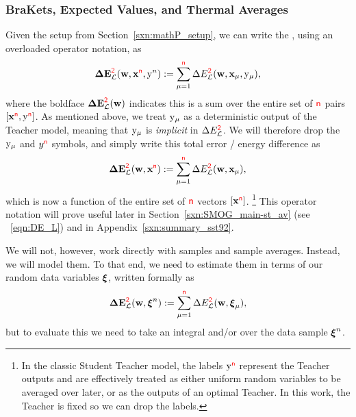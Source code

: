 \subsubsection{BraKets, Expected Values, and Thermal Averages}
\label{sxn:mathP_averages}
Given the setup from Section~\ref{sxn:mathP_setup},
we can write the \TotalDataSampleError,
using an overloaded operator notation, as
\begin{align}
  \label{eqn:detopxy}
  \mathbf{\Delta {E}}^{{\color{red}\sf{2}}}_{\mathcal{L}}(\mathbf{w}, \mathbf{x}^{{\color{red}\sf{n}}}, \mathrm{y}^{n}) :=\sum_{\mu=1}^{{\color{red}\sf{n}}}\Delta E^{{\color{red}\sf{2}}}_{\mathcal{L}}({\mathbf{w}},{\mathbf{x}}_{\mu}, \mathrm{y}_{\mu})  ,
\end{align}
where the boldface $\mathbf{\Delta {E}}^{{\color{red}\sf{2}}}_{\mathcal{L}}(\mathbf{w})$ indicates this is a sum over the entire set of ${\color{red}\sf{n}}$ pairs $[\mathbf{x}^{{\color{red}\sf{n}}}, \mathrm{y}^{{\color{red}\sf{n}}}]$.
As mentioned above, we treat $\mathrm{y}_{\mu}$ as a deterministic output of the Teacher model, meaning that
$\mathrm{y}_{\mu}$ is \emph{implicit} in $\Delta E^{{\color{red}\sf{2}}}_{\mathcal{L}}$.
We will therefore drop the $\mathrm{y}_{\mu}$ and $y^{{\color{red}\sf{n}}}$ symbols, 
and simply write this total error / energy difference as
\begin{align}
  \label{eqn:detox_FIXLATER}
  \mathbf{\Delta {E}}^{{\color{red}\sf{2}}}_{\mathcal{L}}(\mathbf{w}, \mathbf{x}^{{\color{red}\sf{n}}}) :=\sum_{\mu=1}^{{\color{red}\sf{n}}}\Delta E^{{\color{red}\sf{2}}}_{\mathcal{L}}({\mathbf{w}},{\mathbf{x}}_{\mu})  ,
\end{align}
which is now a function of the entire set of ${\color{red}\sf{n}}$ vectors $[\mathbf{x}^{{\color{red}\sf{n}}}]$.%
\footnote{In the classic Student Teacher model, the labels  $\mathrm{y}^{{\color{red}\sf{n}}}$ represent the Teacher outputs and are effectively treated as either uniform random variables to be averaged over later, or as the outputs of an optimal Teacher. In this work, the Teacher is fixed so we can drop the labels.}
This operator notation will prove useful later in Section~\ref{sxn:SMOG_main-st_av}
(see \EQN~\ref{eqn:DE_L}) and in Appendix~\ref{sxn:summary_sst92}.

We will not, however, work directly with samples and sample averages.
Instead, we will model them.
To that end, we need to estimate them 
in terms of our random data variables $\boldsymbol{\xi}$, written formally as
\begin{align}
\label{eqn:tdse}
\mathbf{\Delta {E}}^{{\color{red}\sf{2}}}_{\mathcal{L}}(\mathbf{w}, \boldsymbol{\xi}^{n}) := \sum_{\mu=1}^{{\color{red}\sf{n}}}\Delta E^{{\color{red}\sf{2}}}_{\mathcal{L}}(\mathbf{w},\boldsymbol{\xi}_{\mu}) ,
\end{align}
but to evaluate this we need to take an integral and/or \ExpectedValue over the data sample $\boldsymbol{\xi}^{n}$.

